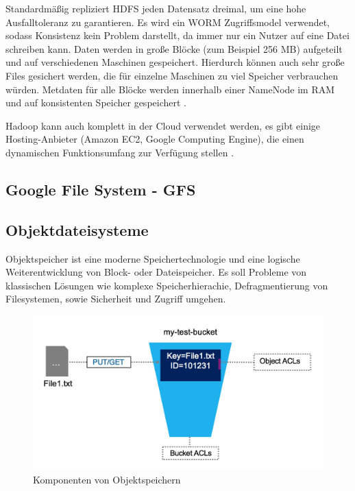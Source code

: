 Standardmäßig repliziert HDFS jeden Datensatz dreimal, um eine hohe Ausfalltoleranz zu garantieren. Es wird ein \ac{WORM} Zugriffsmodel verwendet, sodass Konsistenz kein Problem darstellt, da immer nur ein Nutzer auf eine Datei schreiben kann. Daten werden in große Blöcke (zum Beispiel 256 MB) aufgeteilt und auf verschiedenen Maschinen gespeichert. Hierdurch können auch sehr große Files gesichert werden, die für einzelne Maschinen zu viel Speicher verbrauchen würden. Metdaten für alle Blöcke werden innerhalb einer NameNode im RAM und auf konsistenten Speicher gespeichert  \parencite[Kap. I,2]{alapati.2016}.

Hadoop kann auch komplett in der Cloud verwendet werden, es gibt einige Hosting-Anbieter (Amazon EC2, Google Computing Engine), die einen dynamischen Funktionsumfang zur Verfügung stellen \parencite[Kap. I, 1]{alapati.2016}.

\subsection{Google File System - GFS} 
\subsection{Objektdateisysteme} \label{subsec:objectstorage}

Objektspeicher ist eine moderne Speichertechnologie und eine logische Weiterentwicklung von Block- oder Dateispeicher. Es soll Probleme von klassischen Lösungen wie komplexe Speicherhierachie, Defragmentierung von Filesystemen, sowie Sicherheit und Zugriff umgehen.

\begin{figure}[hbt]
	\centering
	\includegraphics[scale=0.4]{images/object-storage}
	\caption{Komponenten von Objektspeichern \parencite[S. 5]{Rios.2017}}
	\label{fig:objectstorage}
\end{figure}

